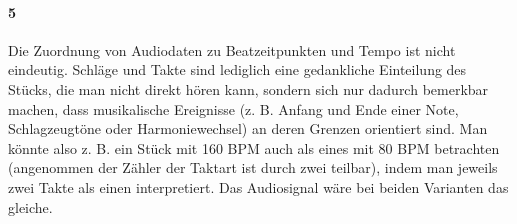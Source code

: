 {	\paragraph{5}  %
	{
		Die Zuordnung von Audiodaten zu Beatzeitpunkten und Tempo ist nicht eindeutig.
		Schläge und Takte sind lediglich eine gedankliche Einteilung des Stücks,
			die man nicht direkt hören kann,
			sondern sich nur dadurch bemerkbar machen,
			dass musikalische Ereignisse
			(z. B. Anfang und Ende einer Note, Schlagzeugtöne oder Harmoniewechsel)
			an deren Grenzen orientiert sind.
		Man könnte also z. B. ein Stück mit 160 \ac{BPM} auch als eines mit 80 \ac{BPM} betrachten
			(angenommen der Zähler der Taktart ist durch zwei teilbar),
			indem man jeweils zwei Takte als einen interpretiert.
		Das Audiosignal wäre bei beiden Varianten das gleiche.
	}
}
